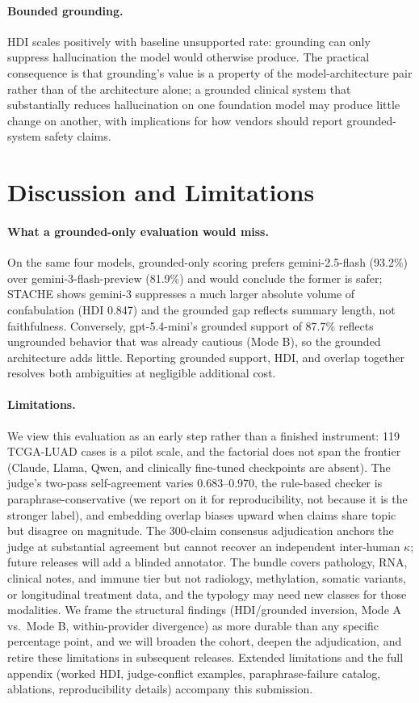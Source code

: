 \documentclass{article}
\theoremstyle{plain}
\begin{document}
\paragraph{Bounded grounding.} HDI scales positively with baseline unsupported rate: grounding can only suppress hallucination the model would otherwise produce. The practical consequence is that grounding's value is a property of the model-architecture pair rather than of the architecture alone; a grounded clinical system that substantially reduces hallucination on one foundation model may produce little change on another, with implications for how vendors should report grounded-system safety claims.

\section{Discussion and Limitations}
\label{sec:discussion}

\paragraph{What a grounded-only evaluation would miss.} On the same four models, grounded-only scoring prefers gemini-2.5-flash (93.2\%) over gemini-3-flash-preview (81.9\%) and would conclude the former is safer; STACHE shows gemini-3 suppresses a much larger absolute volume of confabulation (HDI 0.847) and the grounded gap reflects summary length, not faithfulness. Conversely, gpt-5.4-mini's grounded support of 87.7\% reflects ungrounded behavior that was already cautious (Mode B), so the grounded architecture adds little. Reporting grounded support, HDI, and overlap together resolves both ambiguities at negligible additional cost.

\paragraph{Limitations.} We view this evaluation as an early step rather than a finished instrument: 119 TCGA-LUAD cases is a pilot scale, and the factorial does not span the frontier (Claude, Llama, Qwen, and clinically fine-tuned checkpoints are absent). The judge's two-pass self-agreement varies 0.683--0.970, the rule-based checker is paraphrase-conservative (we report on it for reproducibility, not because it is the stronger label), and embedding overlap biases upward when claims share topic but disagree on magnitude. The 300-claim consensus adjudication anchors the judge at substantial agreement but cannot recover an independent inter-human $\kappa$; future releases will add a blinded annotator. The bundle covers pathology, RNA, clinical notes, and immune tier but not radiology, methylation, somatic variants, or longitudinal treatment data, and the typology may need new classes for those modalities. We frame the structural findings (HDI/grounded inversion, Mode A vs.\ Mode B, within-provider divergence) as more durable than any specific percentage point, and we will broaden the cohort, deepen the adjudication, and retire these limitations in subsequent releases. Extended limitations and the full appendix (worked HDI, judge-conflict examples, paraphrase-failure catalog, ablations, reproducibility details) accompany this submission.
\end{document}
